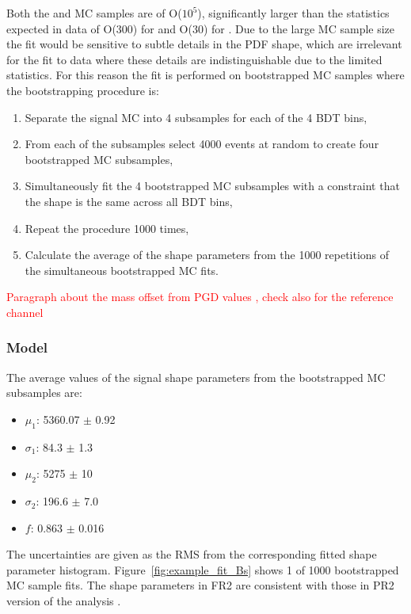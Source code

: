 Both the \Bsmumu and \Bdmumu MC samples are of O($10^5$), significantly larger than the statistics expected in data of O(300) for \Bsmumu and O(30) for \Bdmumu. 
Due to the large MC sample size the fit would be sensitive to subtle details in the PDF shape, which are irrelevant for the fit to data where these details are indistinguishable due to the limited statistics. For this reason the fit is performed on bootstrapped MC samples where the bootstrapping procedure is:
\begin{enumerate}
    \item Separate the signal MC into 4 subsamples for each of the 4 BDT bins,
    \item From each of the subsamples select 4000 events at random to create four bootstrapped MC subsamples,
    \item Simultaneously fit the 4 bootstrapped MC subsamples with a constraint that the shape is the same across all BDT bins,
    \item Repeat the procedure 1000 times,
    \item Calculate the average of the shape parameters from the 1000 repetitions of the simultaneous bootstrapped MC fits.
\end{enumerate}

\textcolor{red}{Paragraph about the mass offset from PGD values , check also for the reference channel}



\subsubsection{\Bsmumu Model}
\label{subsubsec:BsmumuModel}

The average values of the \Bsmumu signal shape parameters from the bootstrapped MC subsamples are:
\begin{itemize}
\item $\mu_1$: 5360.07 $\pm$ 0.92
\item $\sigma_1$: 84.3 $\pm$ 1.3
\item $\mu_2$: 5275 $\pm$ 10
\item $\sigma_2$: 196.6 $\pm$ 7.0
\item $f$: 0.863 $\pm$ 0.016 
\end{itemize}
 The uncertainties are given as the RMS from the corresponding fitted shape parameter histogram. Figure~\ref{fig:example_fit_Bs} shows 1 of 1000 bootstrapped MC sample fits. The shape parameters in FR2 are consistent with those in PR2 version of the analysis \cite{Cerri:2311593}.


